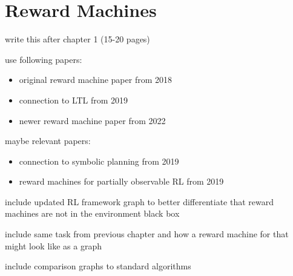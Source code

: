 \section{Reward Machines}

\begin{notes}
    write this after chapter 1 (15-20 pages)

    use following papers:

    \begin{itemize}
        \item original reward machine paper from 2018 \cite{RM2018}
        \item connection to LTL from 2019 \cite{LTL2019}
        \item newer reward machine paper from 2022 \cite{RM2022}
    \end{itemize}

    maybe relevant papers:

    \begin{itemize}
        \item connection to symbolic planning from 2019 \cite{SP2019}
        \item reward machines for partially observable RL from 2019 \cite{PORL2019}
    \end{itemize}

    include updated RL framework graph to better differentiate that reward machines are not in the environment black box

    include same task from previous chapter and how a reward machine for that might look like as a graph

    include comparison graphs to standard algorithms
\end{notes}